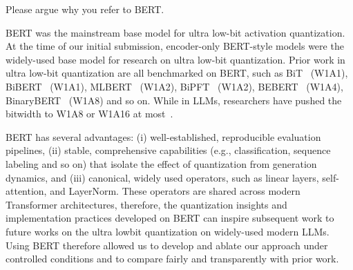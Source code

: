 \begin{revcommentToAssociateEditor}
Please argue why you refer to BERT. 
\label{sec:why-use-bert}
\end{revcommentToAssociateEditor}
\begin{revmeta}[]

BERT was the mainstream base model for ultra low-bit activation quantization. At the time of our initial submission, encoder-only BERT-style models were the widely-used base model for research on ultra low-bit quantization. Prior work in ultra low-bit quantization are all benchmarked on BERT, such as BiT~\cite{liu2022bit} (W1A1), BiBERT~\cite{qin2022bibert} (W1A1), MLBERT~\cite{mlbert} (W1A2), BiPFT~\cite{xing2024bipft} (W1A2), BEBERT~\cite{bebert} (W1A4), BinaryBERT~\cite{bai2020binarybert} (W1A8) and so on. While in LLMs, researchers have pushed the bitwidth to W1A8 or W1A16 at most~\cite{shang2023pbllm,chen2024dbllm,huang2024billm,wang2023bitnet}. 

BERT has several advantages: (i) well-established, reproducible evaluation pipelines, (ii) stable, comprehensive capabilities (e.g., classification, sequence labeling and so on) that isolate the effect of quantization from generation dynamics, and (iii) canonical, widely used operators, such as linear layers, self-attention, and LayerNorm. These operators are shared across modern Transformer architectures, therefore, the quantization insights and implementation practices developed on BERT can inspire subsequent work to future works on the ultra lowbit quantization on widely-used modern LLMs. 
Using BERT therefore allowed us to develop and ablate our approach under controlled conditions and to compare fairly and transparently with prior work. 


\end{revmeta}

